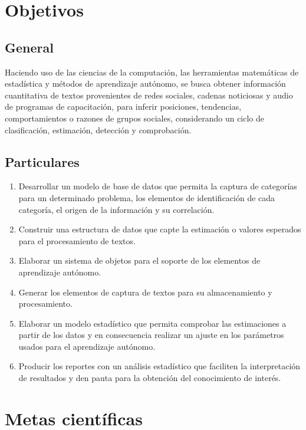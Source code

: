 \section {Objetivos}
\subsection {General}
Haciendo uso de las ciencias de la computación, las herramientas matemáticas de estadística y métodos de aprendizaje autónomo, se busca obtener información cuantitativa de textos provenientes de redes sociales, cadenas noticiosas y audio de programas de capacitación, para inferir posiciones, tendencias, comportamientos o razones de grupos sociales, considerando un ciclo de clasificación, estimación, detección y comprobación.
\subsection {Particulares}
\begin{enumerate}
    \item Desarrollar un modelo de base de datos que permita la captura de categorías para un determinado problema, los elementos de identificación de cada categoría, el origen de la información y su correlación.
    \item Construir una estructura de datos que capte la estimación o valores esperados para el procesamiento de textos.
    \item Elaborar un sistema de objetos para el soporte de los elementos de aprendizaje autónomo.
    \item Generar los elementos de captura de textos para su almacenamiento y procesamiento.
    \item Elaborar un modelo estadístico que permita comprobar las estimaciones a partir de los datos y en consecuencia realizar un ajuste en los parámetros usados para el aprendizaje autónomo.
    \item Producir los reportes con un análisis estadístico que faciliten la interpretación de resultados y den pauta para la obtención del conocimiento de interés.
\end{enumerate}
\section {Metas científicas}
